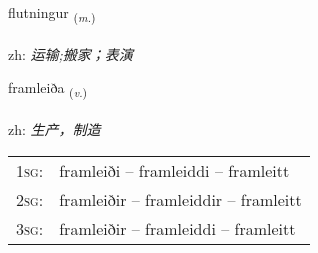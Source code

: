 \documentclass[frontgrid, backgrid]{flacards}\usepackage[]{graphicx}\usepackage[]{color}
\begin{document}
\renewcommand{\flhead}{\vskip5pt \fboxsep=0pt {\small\bfseries\footnotesize Nafnorð | 名词}}
\renewcommand{\fcfoot}{\vskip5pt \fboxsep=0pt \hspace{2pt}{\small\bfseries\footnotesize 2K}}

\renewcommand{\blhead}{\vskip5pt {\small\bfseries\footnotesize Nafnorð | 名词 }}
\renewcommand{\bcfoot}{\vskip5pt \hspace{2pt}{\small\bfseries\footnotesize 2K}}


{flutningur \small{\textsubscript{(\textit{m.})}} \\[1ex] %
\textphonetic{[flʏhtniŋkʏr]} \\
zh: \emph{运输;搬家；表演} \\  [2ex]
\renewcommand*{\arraystretch}{0.8}
}

\renewcommand{\flhead}{\vskip5pt \fboxsep=0pt {\small\bfseries\footnotesize Sagnorð | 动词}}
\renewcommand{\fcfoot}{\vskip5pt \fboxsep=0pt \hspace{2pt}{\small\bfseries\footnotesize 2K}}

\renewcommand{\blhead}{\vskip5pt {\small\bfseries\footnotesize Sagnorð | 动词 }}
\renewcommand{\bcfoot}{\vskip5pt \hspace{2pt}{\small\bfseries\footnotesize 2K}}


{framleiða \small{\textsubscript{(\textit{v.})}} \\[1ex] %
\textphonetic{[framleiða]} \\
zh: \emph{生产，制造} \\  [2ex]
\renewcommand*{\arraystretch}{0.8}
\begin{tabular}{p{1cm}l}
\textsc{1sg}: & framleiði -- framleiddi -- framleitt \\ 
\textsc{2sg}: & framleiðir -- framleiddir -- framleitt \\ 
\textsc{3sg}: & framleiðir -- framleiddi -- framleitt \\ 
\end{tabular}
}
\end{document}
